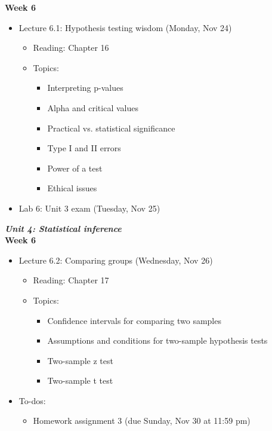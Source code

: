 \documentclass[11pt]{article}
\begin{document}
\textbf{Week 6}
\begin{itemize}
    \item Lecture 6.1: Hypothesis testing wisdom (Monday, Nov 24)
    \begin{itemize}
        \item Reading: Chapter 16
        \item Topics: 
        \begin{itemize}
            \item Interpreting p-values
            \item Alpha and critical values
            \item Practical vs. statistical significance
            \item Type I and II errors
            \item Power of a test
            \item Ethical issues
        \end{itemize}
    \end{itemize}
    \item Lab 6: Unit 3 exam (Tuesday, Nov 25)
\end{itemize}





\Large \textit{\textbf{Unit 4: Statistical inference}} \\

\large \textbf{Week 6}

\begin{itemize}
    \item Lecture 6.2: Comparing groups (Wednesday, Nov 26)
    \begin{itemize}
        \item Reading: Chapter 17
        \item Topics:
        \begin{itemize}
            \item Confidence intervals for comparing two samples
            \item Assumptions and conditions for two-sample hypothesis tests
            \item Two-sample z test
            \item Two-sample t test
        \end{itemize}
    \end{itemize}
    \item To-dos:
    \begin{itemize}
        \item Homework assignment 3 (due Sunday, Nov 30 at 11:59 pm)
    \end{itemize}
\end{itemize}
\end{document}
